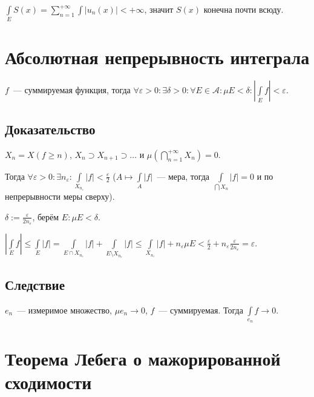 \documentclass{article}
\begin{document}
                $\int\limits_{E} S(x) = \sum\limits^{+\infty}_{n = 1} \int\limits | u_n(x) | < +\infty$, значит $S(x)$ конечна почти всюду.
    
    \newpage
    
    \section{Абсолютная непрерывность интеграла}
    
        $f$~--- суммируемая функция, тогда $\forall \varepsilon > 0 : \exists \delta > 0 : \forall E \in \mathcal{A} : \mu E < \delta : \left| \int\limits_{E} f \right| < \varepsilon$.
        
        \subsection{Доказательство}
        
            $X_n = X \left( f \geqslant n \right)$, $X_n \supset X_{n + 1} \supset \ldots$ и $\mu \left( \bigcap\limits^{+\infty}_{n = 1} X_n \right) = 0$.
            
            Тогда $\forall \varepsilon > 0 : \exists n_{\varepsilon} : \int\limits_{X_{n_{\varepsilon}}} |f| < \frac{\varepsilon}{2}$ ($A \mapsto \int\limits_{A} |f|$~--- мера, тогда $\int\limits_{\bigcap X_n} |f| = 0$ и по непрерывности меры сверху).
            
            $\delta := \frac{\varepsilon}{2 n_{\varepsilon}}$, берём $E : \mu E < \delta$.
            
            $\left| \int\limits_{E} f \right| \leqslant \int\limits_{E} |f| = \int\limits_{E \cap X_{n_{\varepsilon}}} |f| + \int\limits_{E \setminus X_{n_{\varepsilon}}} |f| \leqslant \int\limits_{X_{n_{\varepsilon}}} |f| + n_{\varepsilon} \mu E < \frac{\varepsilon}{2} + n_{\varepsilon} \frac{\varepsilon}{2 n_{\varepsilon}} = \varepsilon$.
            
        \subsection{Следствие}
        
            $e_n$~--- измеримое множество, $\mu e_n \rightarrow 0$, $f$~--- суммируемая. Тогда $\int\limits_{e_n} f \rightarrow 0$.
 
    \newpage
    
    \section{Теорема Лебега о мажорированной сходимости}
    
\end{document}
